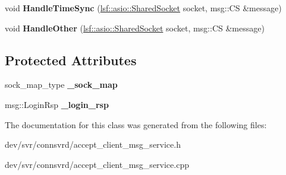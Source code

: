 \begin{DoxyCompactItemize}
\item 
\hypertarget{classAcceptClientMsgService_a2d0a9ba1fd95212e1b9a7219eb4beaba}{
void {\bfseries HandleTimeSync} (\hyperlink{classlsf_1_1asio_1_1SharedSocket}{lsf::asio::SharedSocket} socket, msg::CS \&message)}
\label{classAcceptClientMsgService_a2d0a9ba1fd95212e1b9a7219eb4beaba}

\item 
\hypertarget{classAcceptClientMsgService_a3b498e6ffdb9a0c1c21927c54080d4bb}{
void {\bfseries HandleOther} (\hyperlink{classlsf_1_1asio_1_1SharedSocket}{lsf::asio::SharedSocket} socket, msg::CS \&message)}
\label{classAcceptClientMsgService_a3b498e6ffdb9a0c1c21927c54080d4bb}

\end{DoxyCompactItemize}
\subsection*{Protected Attributes}
\begin{DoxyCompactItemize}
\item 
\hypertarget{classAcceptClientMsgService_aabc6a1a27de4263791d9450807bed914}{
sock\_\-map\_\-type {\bfseries \_\-sock\_\-map}}
\label{classAcceptClientMsgService_aabc6a1a27de4263791d9450807bed914}

\item 
\hypertarget{classAcceptClientMsgService_ad06a6e826821c9f949c5cf9f35f9c641}{
msg::LoginRsp {\bfseries \_\-login\_\-rsp}}
\label{classAcceptClientMsgService_ad06a6e826821c9f949c5cf9f35f9c641}

\end{DoxyCompactItemize}


The documentation for this class was generated from the following files:\begin{DoxyCompactItemize}
\item 
dev/svr/connsvrd/accept\_\-client\_\-msg\_\-service.h\item 
dev/svr/connsvrd/accept\_\-client\_\-msg\_\-service.cpp\end{DoxyCompactItemize}
